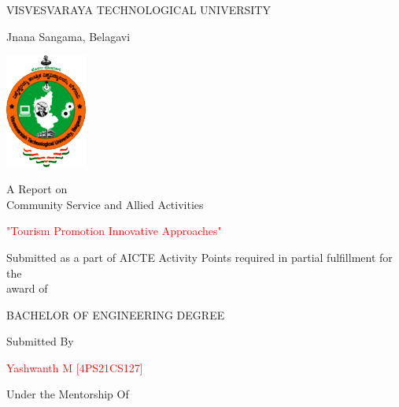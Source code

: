 \thispagestyle{empty}



\begin{center}

    \fontsize{18}{20}\selectfont \textcolor{blue1}{VISVESVARAYA TECHNOLOGICAL UNIVERSITY}

    \vspace{0.1cm}

    \fontsize{16}{20}\selectfont \textcolor{blue1}{Jnana Sangama, Belagavi}

    \vspace{0.7cm}
    
    \includegraphics[width=0.2\textwidth]{VTU.png}

    \vspace{0.3cm}

    \fontsize{16}{20}\selectfont A Report on \\
    Community Service and Allied Activities

    \fontsize{18}{20}\selectfont \textcolor{red}{"Tourism Promotion Innovative Approaches"}

    \fontsize{13}{20}\selectfont Submitted as a part of AICTE Activity Points required in partial fulfillment for the \\
    \vspace{-0.5cm}
    award of

    \fontsize{14}{20}\selectfont BACHELOR OF ENGINEERING DEGREE

    \fontsize{16}{20}\selectfont \textcolor{blue2}{Submitted By}

    \fontsize{16}{20}\selectfont \textcolor{red}{Yashwanth M [4PS21CS127]}


    \fontsize{15}{20}\selectfont \textcolor{blue2}{Under the Mentorship Of}


\end{center}
